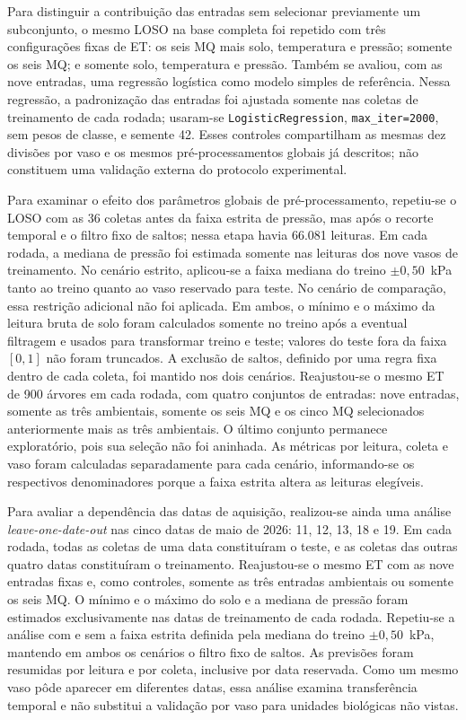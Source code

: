 Para distinguir a contribuição das entradas sem selecionar previamente
um subconjunto, o mesmo LOSO na base completa foi repetido com três
configurações fixas de ET: os seis MQ mais solo, temperatura e pressão;
somente os seis MQ; e somente solo, temperatura e pressão. Também se
avaliou, com as nove entradas, uma regressão logística como modelo
simples de referência. Nessa regressão, a padronização das entradas foi
ajustada somente nas coletas de treinamento de cada rodada; usaram-se
\texttt{LogisticRegression}, \texttt{max\_iter=2000}, sem pesos de classe,
e semente 42. Esses controles compartilham as mesmas dez divisões por
vaso e os mesmos pré-processamentos globais já descritos; não constituem
uma validação externa do protocolo experimental.

Para examinar o efeito dos parâmetros globais de pré-processamento,
repetiu-se o LOSO com as 36 coletas antes da faixa estrita de pressão,
mas após o recorte temporal e o filtro fixo de saltos; nessa etapa havia
66.081 leituras. Em cada rodada, a mediana de pressão foi estimada
somente nas leituras dos nove vasos de treinamento. No cenário estrito,
aplicou-se a faixa mediana do treino $\pm 0{,}50$~kPa tanto ao treino
quanto ao vaso reservado para teste. No cenário de comparação, essa
restrição adicional não foi aplicada. Em ambos, o mínimo e o máximo
da leitura bruta de solo foram calculados somente no treino após a
eventual filtragem e usados para transformar treino e teste; valores
do teste fora da faixa $[0,1]$ não foram truncados. A exclusão de saltos,
definido por uma regra fixa dentro de cada coleta, foi mantido nos dois
cenários. Reajustou-se o mesmo ET de 900 árvores em cada rodada, com
quatro conjuntos de entradas: nove entradas, somente as três ambientais,
somente os seis MQ e os cinco MQ selecionados anteriormente mais as
três ambientais. O último conjunto permanece exploratório, pois sua
seleção não foi aninhada. As métricas por leitura, coleta e vaso foram
calculadas separadamente para cada cenário, informando-se os respectivos
denominadores porque a faixa estrita altera as leituras elegíveis.

Para avaliar a dependência das datas de aquisição, realizou-se ainda
uma análise \textit{leave-one-date-out} nas cinco datas de maio de 2026:
11, 12, 13, 18 e 19. Em cada rodada, todas as coletas de uma data
constituíram o teste, e as coletas das outras quatro datas constituíram
o treinamento. Reajustou-se o mesmo ET com as nove entradas fixas e,
como controles, somente as três entradas ambientais ou somente os seis
MQ. O mínimo e o máximo do solo e a mediana de pressão foram estimados
exclusivamente nas datas de treinamento de cada rodada. Repetiu-se a
análise com e sem a faixa estrita definida pela mediana do treino
$\pm 0{,}50$~kPa, mantendo em ambos os cenários o filtro fixo de saltos.
As previsões foram resumidas por leitura e por coleta, inclusive por
data reservada. Como um mesmo vaso pôde aparecer em diferentes datas,
essa análise examina transferência temporal e não substitui a validação
por vaso para unidades biológicas não vistas.

